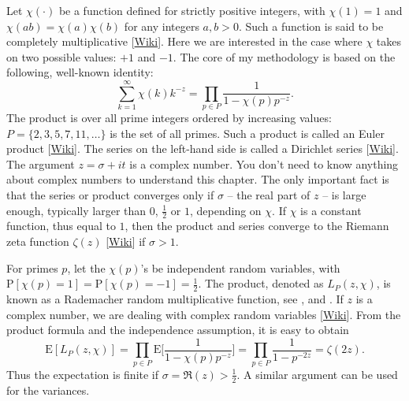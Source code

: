 \documentclass[oneside,10pt]{book}
\begin{document}
Let $\chi(\cdot)$ be a function defined for strictly positive integers, with $\chi(1)=1$ and $\chi(ab)=\chi(a)\chi(b)$ for
any integers $a,b>0$. Such a function is said to be
\textcolor{index}{completely multiplicative} [\href{https://en.wikipedia.org/wiki/Completely_multiplicative_function}{Wiki}].
Here we are interested in the case where $\chi$ takes on two possible values: $+1$ and $-1$. The core of my methodology is based on the following, well-known identity:
\begin{equation}
\sum_{k=1}^\infty \chi(k) k^{-z} = \prod_{p\in P} \frac{1}{1-\chi(p) p^{-z}}.\label{bore}
\end{equation}
The product is over all prime integers ordered by increasing values: $P=\{2,3,5,7,11,\dots\}$ is the set of all primes. Such a product is called an \textcolor{index}{Euler product} [\href{https://en.wikipedia.org/wiki/Euler_product}{Wiki}]. The series on the left-hand side is called
a \textcolor{index}{Dirichlet series} [\href{https://en.wikipedia.org/wiki/Dirichlet_series}{Wiki}]. The argument $z=\sigma+it$ is a complex number. You don't need to know anything about complex numbers to understand this chapter. The only important fact is that the series or product converges only if $\sigma$ -- the real part of $z$ -- is large enough, typically larger than $0$, $\frac{1}{2}$ or $1$, depending on $\chi$. If $\chi$ is a constant function, thus equal to $1$, then the product and series converge to the
 \textcolor{index}{Riemann zeta function} $\zeta(z)$ [\href{https://en.wikipedia.org/wiki/Riemann_zeta_function}{Wiki}] if $\sigma>1$.

For primes $p$,  let the $\chi(p)$'s be independent random variables, with $\text{P}[\chi(p)=1] =  \text{P}[\chi(p)=-1] =\frac{1}{2}$.
The product, denoted as $L_P(z,\chi)$, is known as a \textcolor{index}{Rademacher random multiplicative function}, see \cite{harper2020bb}, \cite{harper2020} and \cite{yukkam2013}. If $z$ is a complex number, we are dealing with
 \textcolor{index}{complex random variables} [\href{https://en.wikipedia.org/wiki/Complex_random_variable}{Wiki}]. From the product formula and the independence assumption, it is easy to obtain
\begin{equation}
\text{E} [L_P(z,\chi)]=\prod_{p\in P} \text{E}\bigg[\frac{1}{1-\chi(p)p^{-z}}\bigg]=\prod_{p\in P }\frac{1}{1-p^{-2z}}=\zeta(2z).\label{proofrn}
\end{equation}
Thus the expectation is finite if $\sigma=\Re(z)>\frac{1}{2}$. A similar argument can be used for the variances.
\end{document}

